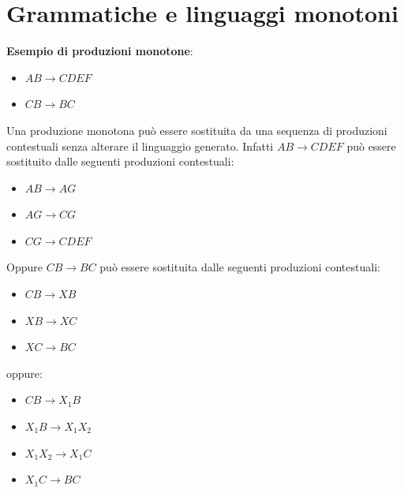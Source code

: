 \documentclass[12pt]{report}
\begin{document}
	\section{Grammatiche e linguaggi monotoni}
	{
	}
	\textbf{Esempio di produzioni monotone}:
	\begin{itemize}
		\item $AB \to CDEF$
		\item $CB \to BC$
	\end{itemize}
	Una produzione monotona può essere sostituita da una sequenza di produzioni contestuali senza alterare il linguaggio generato.
	Infatti $AB \to CDEF$ può essere sostituito dalle seguenti produzioni contestuali:
	\begin{itemize}
		\item $AB \to AG$
		\item $AG \to CG$
		\item $CG \to CDEF$
	\end{itemize}
	Oppure $CB \to BC$ può essere sostituita dalle seguenti produzioni contestuali:
	\begin{itemize}
		\item $CB \to XB$
		\item $XB \to XC$
		\item $XC \to BC$
	\end{itemize}
	oppure:
	\begin{itemize}
		\item $CB \to X_1B$
		\item $X_1B \to X_1X_2$
		\item $X_1X_2 \to X_1C$
		\item $X_1C \to BC$
	\end{itemize}
\end{document}
